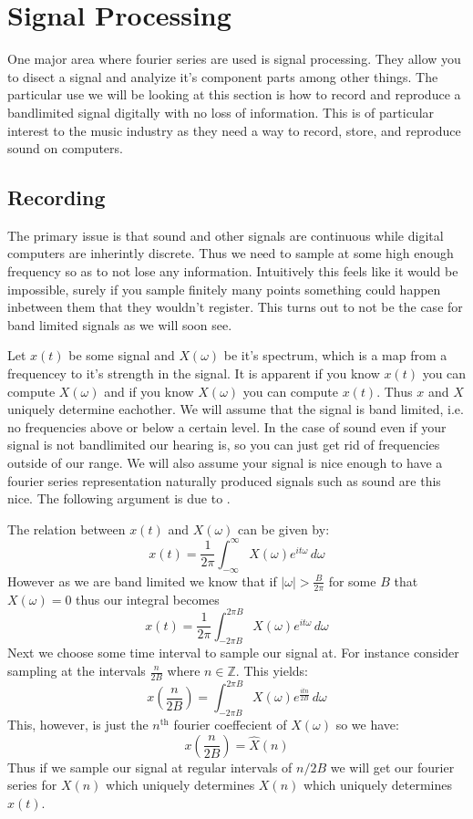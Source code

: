 \documentclass [../article.tex]{subfiles}
\begin{document}
  \section{Signal Processing}
  One major area where fourier series are used is signal
  processing. They allow you to disect a signal and analyize
  it's component parts among other things. The particular use
  we will be looking at this section is how to record and reproduce
  a bandlimited signal digitally with no loss of information.
  This is of particular interest to the music industry as they
  need a way to record, store, and reproduce sound on computers.

  \subsection{Recording}
  The primary issue is that sound and other signals are continuous
  while digital computers are inherintly discrete. Thus we need
  to sample at some high enough frequency so as to not lose any
  information. Intuitively this feels like it would be impossible,
  surely if you sample finitely many points something could happen
  inbetween them that they wouldn't register. This turns out to not
  be the case for band limited signals as we will soon see.

  Let $x(t)$ be some signal and $X(\omega)$ be it's
  spectrum, which is a map from a frequencey to it's
  strength in the signal. It is apparent if you know $x(t)$
  you can compute $X(\omega)$ and if you know $X(\omega)$
  you can compute $x(t)$. Thus $x$ and $X$ uniquely determine
  eachother.
  We will assume that the signal is band limited, i.e. no
  frequencies above or below a certain level. In the case of
  sound even if your signal is not bandlimited our hearing is,
  so you can just get rid of frequencies outside of our range.
  We will also assume your signal is nice enough to have a
  fourier series representation naturally produced signals such
  as sound are this nice. The following argument is due to
  \cite{shannon1949}.

  The relation between $x(t)$ and $X(\omega)$ can be given by:
  \[x(t) = \frac{1}{2\pi}\int_{-\infty}^\infty
  X(\omega)e^{it\omega}\,d\omega\]
  However as we are band limited we know that if
  $|\omega| > \frac{B}{2\pi}$ for some $B$ that
  $X(\omega) = 0$ thus our integral becomes
  \[x(t) = \frac{1}{2\pi}\int_{-2\pi B}^{2\pi B}
  X(\omega)e^{it\omega}\,d\omega\]
  Next we choose some time interval to sample our signal at.
  For instance consider sampling at the intervals $\frac{n}{2B}$
  where $n \in \mathbb{Z}$. This yields:
  \[x\left(\frac{n}{2B}\right) =
  \int_{-2\pi B}^{2\pi B}X(\omega)e^{\frac{itn}{2B}}\,d\omega\]
  This, however, is just the $n^{\text{th}}$ fourier coeffecient
  of $X(\omega)$ so we have:
  \[x\left(\frac{n}{2B}\right) = \hat{X}(n)\]
  Thus if we sample our signal at regular intervals of
  $n/2B$ we will get our fourier series for $X(n)$ which
  uniquely determines $X(n)$ which uniquely determines $x(t)$.
\end{document}
